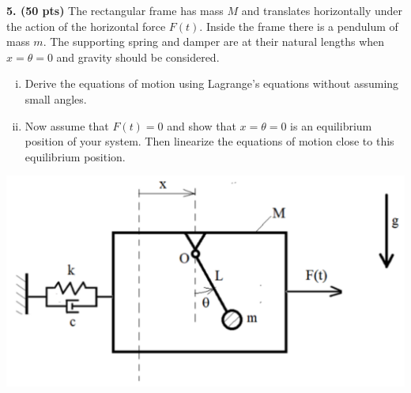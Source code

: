 \pagebreak
\begin{problem}
    \textbf{5. (50 pts)} The rectangular frame has mass $M$ and translates horizontally under the action of the horizontal force $F(t)$. Inside the frame there is a pendulum of mass $m$. 
    The supporting spring and damper are at their natural lengths when $x = \theta = 0$ and gravity should be considered.
    \begin{enumerate}[(i)]
        \item {
            Derive the equations of motion using Lagrange's equations without assuming small angles.
        }
        \item {
            Now assume that $F(t) = 0$ and show that $x = \theta = 0$ is an equilibrium position of your system. Then linearize the equations of motion close to this equilibrium position.
        }
    \end{enumerate}
    \begin{center}
        \includegraphics[width=0.5\linewidth]{homework/hw1/assets/hw1_p5.png}
    \end{center}
\end{problem}

